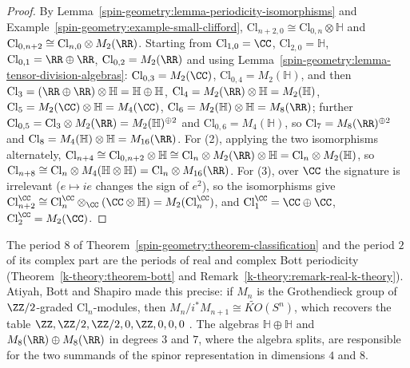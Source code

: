 \begin{proof}
By Lemma~\ref{spin-geometry:lemma-periodicity-isomorphisms} and Example~\ref{spin-geometry:example-small-clifford}, $\mathrm{Cl}_{n+2,0} \cong \mathrm{Cl}_{0,n} \otimes \mathbb{H}$ and $\mathrm{Cl}_{0,n+2} \cong \mathrm{Cl}_{n,0} \otimes M_2(\RR)$. Starting from
$\mathrm{Cl}_{1,0} = \CC$, $\mathrm{Cl}_{2,0} = \mathbb{H}$, $\mathrm{Cl}_{0,1} = \RR \oplus \RR$, $\mathrm{Cl}_{0,2} = M_2(\RR)$ and using Lemma~\ref{spin-geometry:lemma-tensor-division-algebras}:
$\mathrm{Cl}_{0,3} = M_2(\CC)$, $\mathrm{Cl}_{0,4} = M_2(\mathbb{H})$, and then $\mathrm{Cl}_3 = (\RR \oplus \RR) \otimes \mathbb{H} = \mathbb{H} \oplus \mathbb{H}$, $\mathrm{Cl}_4 = M_2(\RR) \otimes \mathbb{H} = M_2(\mathbb{H})$,
$\mathrm{Cl}_5 = M_2(\CC) \otimes \mathbb{H} = M_4(\CC)$, $\mathrm{Cl}_6 = M_2(\mathbb{H}) \otimes \mathbb{H} = M_8(\RR)$; further $\mathrm{Cl}_{0,5} = \mathrm{Cl}_3 \otimes M_2(\RR) = M_2(\mathbb{H})^{\oplus 2}$ and
$\mathrm{Cl}_{0,6} = M_4(\mathbb{H})$, so $\mathrm{Cl}_7 = M_8(\RR)^{\oplus 2}$ and $\mathrm{Cl}_8 = M_4(\mathbb{H}) \otimes \mathbb{H} = M_{16}(\RR)$. For (2), applying the two isomorphisms alternately,
$\mathrm{Cl}_{n+4} \cong \mathrm{Cl}_{0,n+2} \otimes \mathbb{H} \cong \mathrm{Cl}_n \otimes M_2(\RR) \otimes \mathbb{H} = \mathrm{Cl}_n \otimes M_2(\mathbb{H})$, so $\mathrm{Cl}_{n+8} \cong \mathrm{Cl}_n \otimes M_4(\mathbb{H} \otimes \mathbb{H}) = \mathrm{Cl}_n \otimes M_{16}(\RR)$.
For (3), over $\CC$ the signature is irrelevant ($e \mapsto ie$ changes the sign of $e^2$), so the isomorphisms give $\mathrm{Cl}^\CC_{n+2} \cong \mathrm{Cl}^\CC_n \otimes_\CC (\CC \otimes \mathbb{H}) = M_2(\mathrm{Cl}^\CC_n)$, and
$\mathrm{Cl}^\CC_1 = \CC \oplus \CC$, $\mathrm{Cl}^\CC_2 = M_2(\CC)$.
\end{proof}

\begin{remark}\label{spin-geometry:remark-bott-clifford}
The period $8$ of Theorem~\ref{spin-geometry:theorem-classification} and the period $2$ of its complex part are the periods of real and complex Bott periodicity (Theorem~\ref{k-theory:theorem-bott} and
Remark~\ref{k-theory:remark-real-k-theory}). Atiyah, Bott and Shapiro made this precise: if $M_n$ is the Grothendieck group of $\ZZ/2$-graded $\mathrm{Cl}_n$-modules, then $M_n/i^*M_{n+1} \cong \widetilde{KO}(S^n)$,
which recovers the table $\ZZ, \ZZ/2, \ZZ/2, 0, \ZZ, 0, 0, 0$ \cite{atiyah-bott-shapiro-1964}. The algebras $\mathbb{H} \oplus \mathbb{H}$ and $M_8(\RR) \oplus M_8(\RR)$ in degrees $3$ and $7$, where the algebra splits, are
responsible for the two summands of the spinor representation in dimensions $4$ and $8$.
\end{remark}

